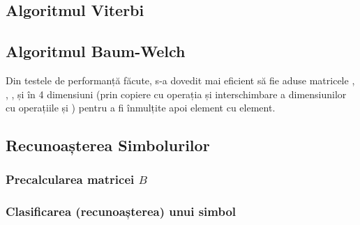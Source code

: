 \documentclass[12pt]{article}
\begin{document}


\subsection{Algoritmul Viterbi}
\label{sec:viterbi-sol}



\subsection{Algoritmul Baum-Welch}
\label{sec:baum-welch-sol}

Din testele de performanță făcute, s-a dovedit mai eficient să fie
aduse matricele , , ,  și
 în 4 dimensiuni (prin copiere cu operația 
și interschimbare a dimensiunilor cu operațiile  și
) pentru a fi înmulțite apoi element cu element.



\subsection{Recunoașterea Simbolurilor}
\label{sec:symbol-recognition-sol}


\subsubsection{Precalcularea matricei $B$}
\label{sec:precomp-b-sol}



\subsubsection{Clasificarea (recunoașterea) unui simbol}
\label{sec:classify-sol}


\end{document}
